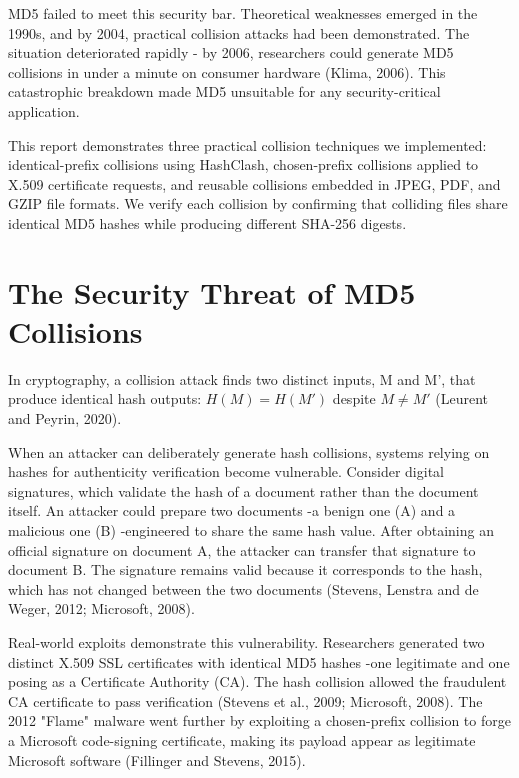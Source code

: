 \documentclass[runningheads]{llncs}
\begin{document}
    MD5 failed to meet this security bar. Theoretical weaknesses emerged in the 1990s, and by 2004, practical collision attacks had been demonstrated. The situation deteriorated rapidly - by 2006, researchers could generate MD5 collisions in under a minute on consumer hardware (Klima, 2006). This catastrophic breakdown made MD5 unsuitable for any security-critical application.

    This report demonstrates three practical collision techniques we implemented: identical-prefix collisions using HashClash, chosen-prefix collisions applied to X.509 certificate requests, and reusable collisions embedded in JPEG, PDF, and GZIP file formats. We verify each collision by confirming that colliding files share identical MD5 hashes while producing different SHA-256 digests.



    \section{The Security Threat of MD5 Collisions}

    In cryptography, a collision attack finds two distinct inputs, M and M', that produce identical hash outputs: $H(M) = H(M')$ despite $M \neq M'$ (Leurent and Peyrin, 2020).

    When an attacker can deliberately generate hash collisions, systems relying on hashes for authenticity verification become vulnerable. Consider digital signatures, which validate the hash of a document rather than the document itself. An attacker could prepare two documents -a benign one (A) and a malicious one (B) -engineered to share the same hash value. After obtaining an official signature on document A, the attacker can transfer that signature to document B. The signature remains valid because it corresponds to the hash, which has not changed between the two documents (Stevens, Lenstra and de Weger, 2012; Microsoft, 2008).

    Real-world exploits demonstrate this vulnerability. Researchers generated two distinct X.509 SSL certificates with identical MD5 hashes -one legitimate and one posing as a Certificate Authority (CA). The hash collision allowed the fraudulent CA certificate to pass verification (Stevens et al., 2009; Microsoft, 2008). The 2012 "Flame" malware went further by exploiting a chosen-prefix collision to forge a Microsoft code-signing certificate, making its payload appear as legitimate Microsoft software (Fillinger and Stevens, 2015).
\end{document}
